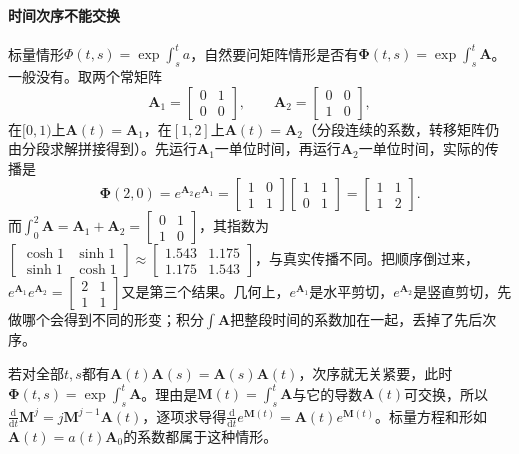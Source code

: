 \paragraph{时间次序不能交换}
标量情形$\Phi(t,s)=\exp\int_s^ta$，自然要问矩阵情形是否有$\bm\Phi(t,s)=\exp\int_s^t\bm A$。一般没有。取两个常矩阵
\[
  \bm A_1=\begin{bmatrix}0&1\\0&0\end{bmatrix},\qquad\bm A_2=\begin{bmatrix}0&0\\1&0\end{bmatrix},
\]
在$[0,1)$上$\bm A(t)=\bm A_1$，在$[1,2]$上$\bm A(t)=\bm A_2$（分段连续的系数，转移矩阵仍由分段求解拼接得到）。先运行$\bm A_1$一单位时间，再运行$\bm A_2$一单位时间，实际的传播是
\[
  \bm\Phi(2,0)=e^{\bm A_2}e^{\bm A_1}=\begin{bmatrix}1&0\\1&1\end{bmatrix}\begin{bmatrix}1&1\\0&1\end{bmatrix}=\begin{bmatrix}1&1\\1&2\end{bmatrix}.
\]
而$\int_0^2\bm A=\bm A_1+\bm A_2=\begin{bmatrix}0&1\\1&0\end{bmatrix}$，其指数为$\begin{bmatrix}\cosh1&\sinh1\\\sinh1&\cosh1\end{bmatrix}\approx\begin{bmatrix}1.543&1.175\\1.175&1.543\end{bmatrix}$，与真实传播不同。把顺序倒过来，$e^{\bm A_1}e^{\bm A_2}=\begin{bmatrix}2&1\\1&1\end{bmatrix}$又是第三个结果。几何上，$e^{\bm A_1}$是水平剪切，$e^{\bm A_2}$是竖直剪切，先做哪个会得到不同的形变；积分$\int\bm A$把整段时间的系数加在一起，丢掉了先后次序。

若对全部$t,s$都有$\bm A(t)\bm A(s)=\bm A(s)\bm A(t)$，次序就无关紧要，此时$\bm\Phi(t,s)=\exp\int_s^t\bm A$。理由是$\bm M(t)=\int_s^t\bm A$与它的导数$\bm A(t)$可交换，所以$\frac{\mathrm d}{\mathrm dt}\bm M^j=j\bm M^{j-1}\bm A(t)$，逐项求导得$\frac{\mathrm d}{\mathrm dt}e^{\bm M(t)}=\bm A(t)e^{\bm M(t)}$。标量方程和形如$\bm A(t)=a(t)\bm A_0$的系数都属于这种情形。

